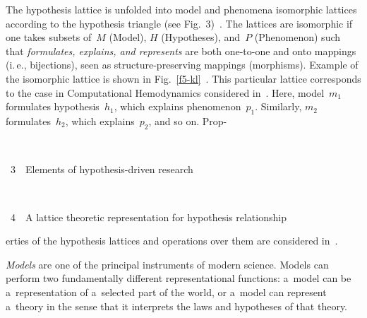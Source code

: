 \begin{multicols}{2}
  The hypothesis lattice is unfolded into model and phenomena isomorphic lattices
according to the hypothesis triangle (see Fig.~3)~\cite{11-kl}. The lattices are
isomorphic if one takes subsets of~$M$ (Model), $H$ (Hypotheses), and~$P$
(Phenomenon) such that \textit{formulates, explains, and represents} are both
  one-to-one and onto mappings (i.\,e., bijections), seen as structure-preserving
mappings (morphisms). Example of the isomorphic lattice is shown in
  Fig.~\ref{f5-kl}~\cite{11-kl}. This particular lattice corresponds to the case in
Computational Hemodynamics considered in~\cite{11-kl}. Here, model~$m_1$
formulates hypothesis~$h_1$, which explains phenomenon~$p_1$.
Similarly,  $m_2$ formulates~$h_2$, which explains~$p_2$, and so on. Prop-\linebreak\vspace*{-12pt}
\begin{center}  %
\vspace*{-3pt}
 \mbox{%
 \epsfxsize=77.487mm
 }

\vspace*{6pt}

\noindent
{{\figurename~3}\ \ \small{Elements of hypothesis-driven research}}

\end{center}


\vspace*{12pt}

\begin{center}  %
\vspace*{-3pt}
\mbox{%
 \epsfxsize=74.477mm
 }
 \end{center}


\noindent
{{\figurename~4}\ \ \small{A lattice theoretic representation for hypothesis relationship}}


\vspace*{16pt}



\addtocounter{figure}{2}


\noindent
erties of the
hypothesis lattices and operations over them are considered in~\cite{13-kl}.



  \textit{Models} are one of the principal instruments of modern science. Models can
perform two fundamentally different representational functions: a~model can be a~representation of a~selected part of the world, or a~model can represent a~theory in the
sense that it interprets the laws and hypotheses of that theory.


\end{multicols}
